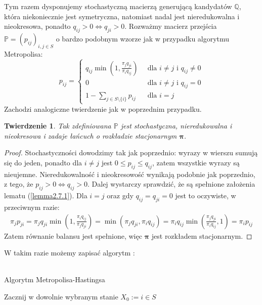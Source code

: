 \documentclass[a4paper]{article}
\theoremstyle{defn}
\theoremstyle{theorem}
\newtheorem{theorem}[defn]{Twierdzenie}
\theoremstyle{lemma}
\theoremstyle{cor}
\theoremstyle{fact}
\begin{document}
Tym razem dysponujemy stochastyczną macierzą generującą kandydatów $\mathbb{Q}$, która niekoniecznie jest symetryczna, natomiast nadal jest nieredukowalna i nieokresowa, ponadto $q_{ij} > 0 	\Leftrightarrow q_{ji} > 0$. Rozważmy macierz przejścia $\mathbb{P} = (p_{ij})_{i,j \in S}$ o bardzo podobnym wzorze jak w przypadku algorytmu Metropolisa:
$$
    p_{ij} = \begin{cases} q_{ij} \min(1, \frac{\pi_j q_{ji}}{\pi_i q_{ij}}) \,\,\,&\text{dla $i \neq j$ i $q_{ij} \neq 0$}\\
                    0 \,\,\, &\text{dla $i \neq j$ i $q_{ij} = 0$}\\
                    1 - \sum\limits_{j \in S \setminus \{i\}} p_{ij}\,\,\, &\text{dla $i = j$}
            \end{cases}
$$
Zachodzi analogiczne twierdzenie jak w poprzednim przypadku.
\begin{theorem}\label{theorem3.3.2}
Tak zdefiniowana $\mathbb{P}$ jest stochastyczna, nieredukowalna i nieokresowa i zadaje łańcuch o rozkładzie stacjonarnym $\boldsymbol{\pi}$.
\end{theorem}
\begin{proof}
Stochastyczności dowodzimy tak jak poprzednio: wyrazy w wierszu sumują się do jeden, ponadto dla $i \neq j$ jest $0 \leq p_{ij} \leq q_{ij}$, zatem wszystkie wyrazy są nieujemne. Nieredukowalność i nieokresowość wynikają podobnie jak poprzednio, z tego, że $p_{ij} > 0 	\Leftrightarrow q_{ij} > 0$. Dalej wystarczy sprawdzić, że są spełnione założenia lematu (\ref{lemma2.7.1}). Dla $i=j$ oraz gdy $q_{ij} = q_{ji} =  0$ jest to oczywiste, w przeciwnym razie:
\begin{align*}
    \pi_j p_{ji} = \pi_j q_{ji} \min(1, \frac{\pi_i q_{ij}}{\pi_j q_{ji}}) =  \min(\pi_j q_{ji}, \pi_i q_{ij}) = \pi_i q_{ij} \min(\frac{\pi_j q_{ji}}{\pi_i q_{ij}}, 1) = \pi_i p_{ij}
\end{align*}
Zatem równanie balansu jest spełnione, więc $\boldsymbol{\pi}$ jest rozkładem stacjonarnym.
\end{proof}
W takim razie możemy zapisać algorytm \cite{hastings}:\\\\
\begin{algorithm}[H]
\caption{Algorytm Metropolisa-Hastingsa}
Zacznij w dowolnie wybranym stanie $X_0 := i \in S$\;
\end{algorithm}
\end{document}
